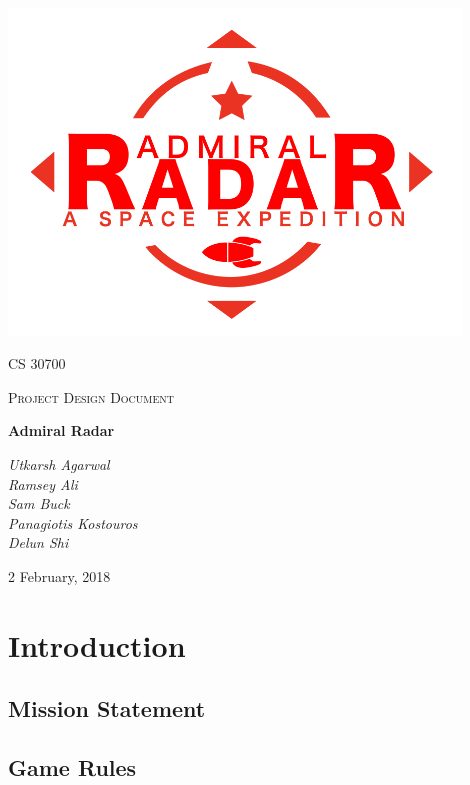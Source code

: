 \documentclass[12pt]{article}
\begin{document}
\begin{titlepage}
	\centering
	\includegraphics[width=0.9\textwidth]{logo}\par\vspace{1cm}
	{\scshape\LARGE CS 30700 \par}
	{\scshape\Large Project Design Document\par}
	\vspace{1.5cm}
	{\Huge\bfseries Admiral Radar\par}
	\vspace{1.5cm}
	{\large\itshape Utkarsh Agarwal\\ Ramsey Ali \\ Sam Buck \\ Panagiotis Kostouros \\ Delun Shi \par}

	\vfill
	{\large 2 February, 2018 \par}
\end{titlepage}

\tableofcontents

\section{Introduction}

\subsection{Mission Statement}


\subsection{Game Rules}

\end{document}
